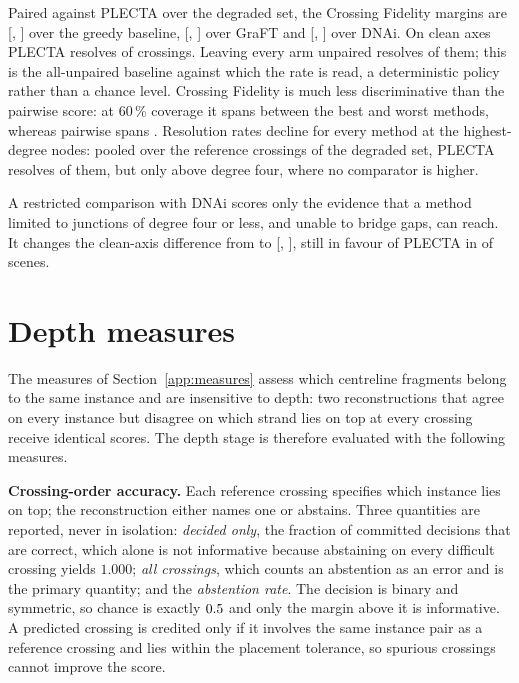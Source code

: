 Paired against PLECTA over the degraded set, the Crossing Fidelity margins are
\PlectaJunctionGreedyDelta{} [\PlectaJunctionGreedyDeltaCILow{},
\PlectaJunctionGreedyDeltaCIHigh{}] over the greedy baseline,
\PlectaJunctionGraFTDelta{} [\PlectaJunctionGraFTDeltaCILow{},
\PlectaJunctionGraFTDeltaCIHigh{}] over GraFT and \PlectaJunctionDNAiDelta{}
[\PlectaJunctionDNAiDeltaCILow{}, \PlectaJunctionDNAiDeltaCIHigh{}] over DNAi.
On clean axes PLECTA resolves \PlectaJunctionCleanPlectaRate{} of crossings.
Leaving every arm unpaired resolves \PlectaJunctionChance{} of them; this is
the all-unpaired baseline against which the rate is read, a deterministic
policy rather than a chance level. Crossing Fidelity is much less
discriminative than the pairwise score: at 60\,\% coverage it spans
\PlectaJunctionSpreadHigh{} between the best and worst methods, whereas
pairwise \Fone{} spans \PlectaPairwiseSpreadHigh{}. Resolution rates decline
for every method at the highest-degree nodes: pooled over the
\PlectaJunctionCount{} reference crossings of the degraded set, PLECTA
resolves \PlectaJunctionPlectaRate{} of them, but only
\PlectaJunctionPlectaDegreeFivePlus{} above degree four, where no comparator
is higher.

A restricted comparison with DNAi scores only the evidence that a method
limited to junctions of degree four or less, and unable to bridge gaps, can
reach. It changes the clean-axis difference from \PlectaDNAiCleanDeltaFOne{}
to \PlectaDNAiRestrictedCleanDeltaFOne{}
[\PlectaDNAiRestrictedCleanDeltaCILow{},
\PlectaDNAiRestrictedCleanDeltaCIHigh{}], still in favour of PLECTA in
\PlectaDNAiRestrictedCleanWinCount{} of \PlectaDNAiCleanSceneCount{} scenes.

\section{Depth measures}
\label{sec:app-depth-measures}

The measures of Section~\ref{app:measures} assess which centreline fragments
belong to the same instance and are insensitive to depth: two reconstructions
that agree on every instance but disagree on which strand lies on top at every
crossing receive identical scores. The depth stage is therefore evaluated with
the following measures.

\textbf{Crossing-order accuracy.} Each reference crossing specifies which
instance lies on top; the reconstruction either names one or abstains. Three
quantities are reported, never in isolation: \emph{decided only}, the fraction
of committed decisions that are correct, which alone is not informative
because abstaining on every difficult crossing yields $1.000$; \emph{all
crossings}, which counts an abstention as an error and is the primary
quantity; and the \emph{abstention rate}. The decision is binary and
symmetric, so chance is exactly $0.5{}$ and only the margin
above it is informative. A predicted crossing is credited only if it involves
the same instance pair as a reference crossing and lies within the placement
tolerance, so spurious crossings cannot improve the score.

